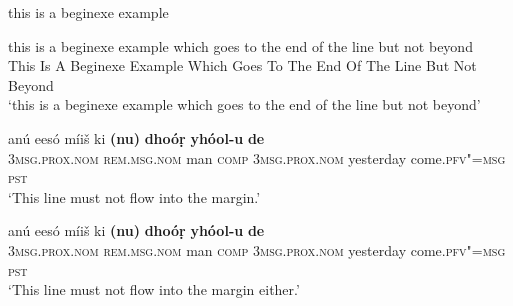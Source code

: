 \begin{exe}
\ex this is a beginexe example
\end{exe}

\begin{exe}
\ex
\gll  this is a beginexe example which goes to the end of the line but not beyond\\
     This Is A Beginexe Example Which Goes To The End Of The Line But Not Beyond\\
\glt  `this is a beginexe example which goes to the end of the line but not beyond'
\end{exe}

 
\ea 
\label{ex:13-227} 
\gll anú eesó míiš ki \textbf{(nu)} \textbf{dhoóṛ} \textbf{yhóol-u} \textbf{de}\\
\textsc{3msg.prox.nom} \textsc{rem.msg.nom} man \textsc{comp} \textsc{3msg.prox.nom} yesterday come.\textsc{pfv"=msg} \textsc{pst}\\
\glt `This line must not flow into the margin.'
\z
 

\begin{exe} 
\ex
\gll anú eesó míiš ki \textbf{(nu)} \textbf{dhoóṛ} \textbf{yhóol-u} \textbf{de}\\
\textsc{3msg.prox.nom} \textsc{rem.msg.nom} man \textsc{comp} \textsc{3msg.prox.nom} yesterday come.\textsc{pfv"=msg} \textsc{pst}\\
\glt `This line must not flow into the margin either.'
\end{exe}


